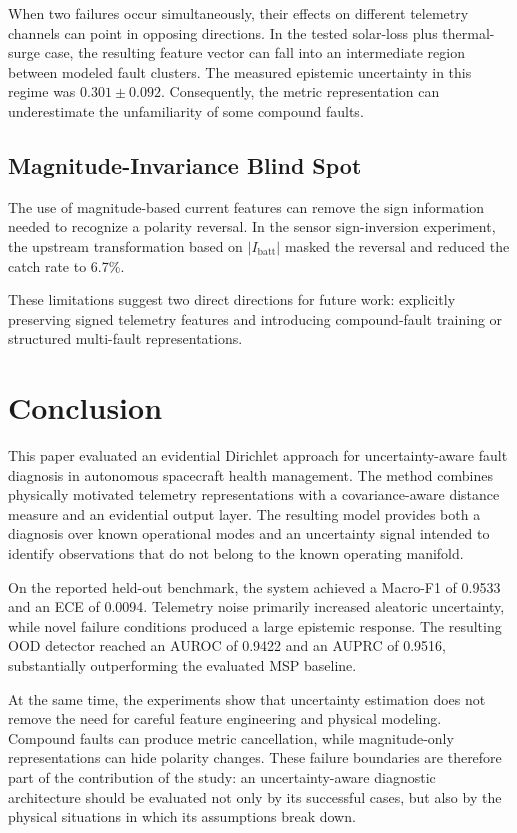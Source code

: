 \documentclass[conference]{IEEEtran}
\begin{document}
When two failures occur simultaneously, their effects on different telemetry
channels can point in opposing directions. In the tested solar-loss plus
thermal-surge case, the resulting feature vector can fall into an
intermediate region between modeled fault clusters. The measured epistemic
uncertainty in this regime was $0.301\pm0.092$. Consequently, the metric
representation can underestimate the unfamiliarity of some compound faults.

\subsection{Magnitude-Invariance Blind Spot}

The use of magnitude-based current features can remove the sign information
needed to recognize a polarity reversal. In the sensor sign-inversion
experiment, the upstream transformation based on $|I_{\mathrm{batt}}|$
masked the reversal and reduced the catch rate to 6.7\%.

These limitations suggest two direct directions for future work: explicitly
preserving signed telemetry features and introducing compound-fault training
or structured multi-fault representations.

\section{Conclusion}

This paper evaluated an evidential Dirichlet approach for uncertainty-aware
fault diagnosis in autonomous spacecraft health management. The method
combines physically motivated telemetry representations with a
covariance-aware distance measure and an evidential output layer. The
resulting model provides both a diagnosis over known operational modes and
an uncertainty signal intended to identify observations that do not belong
to the known operating manifold.

On the reported held-out benchmark, the system achieved a Macro-F1 of 0.9533
and an ECE of 0.0094. Telemetry noise primarily increased aleatoric
uncertainty, while novel failure conditions produced a large epistemic
response. The resulting OOD detector reached an AUROC of 0.9422 and an AUPRC
of 0.9516, substantially outperforming the evaluated MSP baseline.

At the same time, the experiments show that uncertainty estimation does not
remove the need for careful feature engineering and physical modeling.
Compound faults can produce metric cancellation, while magnitude-only
representations can hide polarity changes. These failure boundaries are
therefore part of the contribution of the study: an uncertainty-aware
diagnostic architecture should be evaluated not only by its successful cases,
but also by the physical situations in which its assumptions break down.
\end{document}
